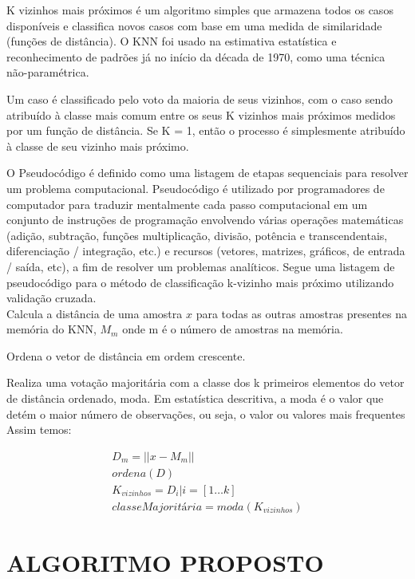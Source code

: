 \documentclass[letterpaper, 10 pt, conference]{ieeeconf}  %
\begin{document}
K vizinhos mais próximos é um algoritmo simples que armazena todos os casos
disponíveis e classifica novos casos com base em uma medida de similaridade
(funções de distância). O KNN foi usado na estimativa estatística e
reconhecimento de padrões já no início da década de 1970, como uma técnica
não-paramétrica.

Um caso é classificado pelo voto da maioria de seus vizinhos, com o caso sendo
atribuído à classe mais comum entre os seus K vizinhos mais próximos medidos por
um função de distância. Se K = 1, então o processo é simplesmente atribuído à
classe de seu vizinho mais próximo.

O Pseudocódigo é definido como uma listagem de etapas sequenciais para resolver
um problema computacional. Pseudocódigo é utilizado por programadores de
computador para traduzir mentalmente cada passo computacional em um conjunto de
instruções de programação envolvendo várias operações matemáticas (adição,
subtração, funções multiplicação, divisão, potência e transcendentais,
diferenciação / integração, etc.) e recursos (vetores, matrizes, gráficos, de
entrada / saída, etc), a fim de resolver um problemas analíticos. Segue uma
listagem de pseudocódigo para o método de classificação k-vizinho mais próximo
utilizando validação cruzada. \\

Calcula a distância de uma amostra $x$ para todas as outras amostras presentes
na memória do KNN, $M_m$ onde m é o número de amostras na memória.

Ordena o vetor de distância em ordem crescente.

Realiza uma votação majoritária com a classe dos k primeiros elementos do vetor
de distância ordenado, moda. Em estatística descritiva, a moda é o valor que
detém o maior número de observações, ou seja, o valor ou valores mais frequentes
Assim temos:

\begin{align}
D_m =  ||x - M_m|| \\
ordena(D) \\
K_{vizinhos} = D_i | i = [1 \ldots k] \\
classe Majoritária = moda(K_{vizinhos})
\end{align}
 



\section{ALGORITMO PROPOSTO}
\end{document}
